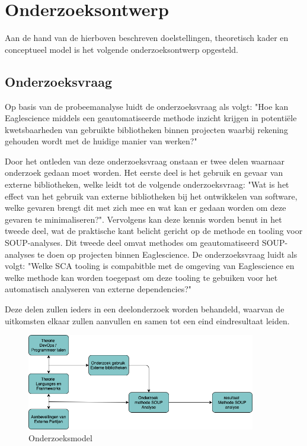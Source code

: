 \section{Onderzoeksontwerp}\label{sec:OP_onderzoeksontwerp}
Aan de hand van de hierboven beschreven doelstellingen, theoretisch kader en conceptueel model is het volgende onderzoeksontwerp opgesteld.

\subsection{Onderzoeksvraag}\label{subsec:onderzoeksvraag-en-deelvragen}
Op basis van de probeemanalyse luidt de onderzoeksvraag als volgt: "Hoe kan Eaglescience middels een geautomatiseerde methode inzicht krijgen in potentiële kwetsbaarheden van gebruikte bibliotheken binnen projecten waarbij rekening gehouden wordt met de huidige manier van werken?"

Door het ontleden van deze onderzoeksvraag onstaan er twee delen waarnaar onderzoek gedaan moet worden. Het eerste deel is het gebruik en gevaar van externe bibliotheken, welke leidt tot de volgende onderzoeksvraag: "Wat is het effect van het gebruik van externe bibliotheken bij het ontwikkelen van software, welke gevaren brengt dit met zich mee en wat kan er gedaan worden om deze gevaren te minimaliseren?". Vervolgens kan deze kennis worden benut in het tweede deel, wat de praktische kant belicht gericht op de methode en tooling voor SOUP-analyses. Dit tweede deel omvat methodes om geautomatiseerd SOUP-analyses te doen op projecten binnen Eaglescience. De onderzoeksvraag luidt als volgt: "Welke SCA tooling is compabitble met de omgeving van Eaglescience en welke methode kan worden toegepast om deze tooling te gebuiken voor het automatisch analyseren van externe dependencies?"

Deze delen zullen ieders in een deelonderzoek worden behandeld, waarvan de uitkomsten elkaar zullen aanvullen en samen tot een eind eindresultaat leiden.
\begin{figure}
    \myfloatalign
    \includegraphics[width=10cm]{gfx/Onderzoekmodel}
    \caption{Onderzoeksmodel}
    \label{fig:OnderzoeksModel}
\end{figure}

